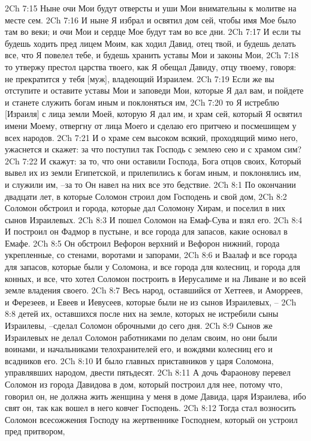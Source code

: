 2Ch 7:15  Ныне очи Мои будут отверсты и уши Мои внимательны к молитве на месте сем.
2Ch 7:16  И ныне Я избрал и освятил дом сей, чтобы имя Мое было там во веки; и очи Мои и сердце Мое будут там во все дни.
2Ch 7:17  И если ты будешь ходить пред лицем Моим, как ходил Давид, отец твой, и будешь делать все, что Я повелел тебе, и будешь хранить уставы Мои и законы Мои,
2Ch 7:18  то утвержу престол царства твоего, как Я обещал Давиду, отцу твоему, говоря: не прекратится у тебя [муж], владеющий Израилем.
2Ch 7:19  Если же вы отступите и оставите уставы Мои и заповеди Мои, которые Я дал вам, и пойдете и станете служить богам иным и поклоняться им,
2Ch 7:20  то Я истреблю [Израиля] с лица земли Моей, которую Я дал им, и храм сей, который Я освятил имени Моему, отвергну от лица Моего и сделаю его притчею и посмешищем у всех народов.
2Ch 7:21  И о храме сем высоком всякий, проходящий мимо него, ужаснется и скажет: за что поступил так Господь с землею сею и с храмом сим?
2Ch 7:22  И скажут: за то, что они оставили Господа, Бога отцов своих, Который вывел их из земли Египетской, и прилепились к богам иным, и поклонялись им, и служили им, --за то Он навел на них все это бедствие.
2Ch 8:1  По окончании двадцати лет, в которые Соломон строил дом Господень и свой дом,
2Ch 8:2  Соломон обстроил и города, которые дал Соломону Хирам, и поселил в них сынов Израилевых.
2Ch 8:3  И пошел Соломон на Емаф-Сува и взял его.
2Ch 8:4  И построил он Фадмор в пустыне, и все города для запасов, какие основал в Емафе.
2Ch 8:5  Он обстроил Вефорон верхний и Вефорон нижний, города укрепленные, со стенами, воротами и запорами,
2Ch 8:6  и Ваалаф и все города для запасов, которые были у Соломона, и все города для колесниц, и города для конных, и все, что хотел Соломон построить в Иерусалиме и на Ливане и во всей земле владения своего.
2Ch 8:7  Весь народ, оставшийся от Хеттеев, и Аморреев, и Ферезеев, и Евеев и Иевусеев, которые были не из сынов Израилевых, --
2Ch 8:8  детей их, оставшихся после них на земле, которых не истребили сыны Израилевы, --сделал Соломон оброчными до сего дня.
2Ch 8:9  Сынов же Израилевых не делал Соломон работниками по делам своим, но они были воинами, и начальниками телохранителей его, и вождями колесниц его и всадников его.
2Ch 8:10  И было главных приставников у царя Соломона, управлявших народом, двести пятьдесят.
2Ch 8:11  А дочь Фараонову перевел Соломон из города Давидова в дом, который построил для нее, потому что, говорил он, не должна жить женщина у меня в доме Давида, царя Израилева, ибо свят он, так как вошел в него ковчег Господень.
2Ch 8:12  Тогда стал возносить Соломон всесожжения Господу на жертвеннике Господнем, который он устроил пред притвором,
